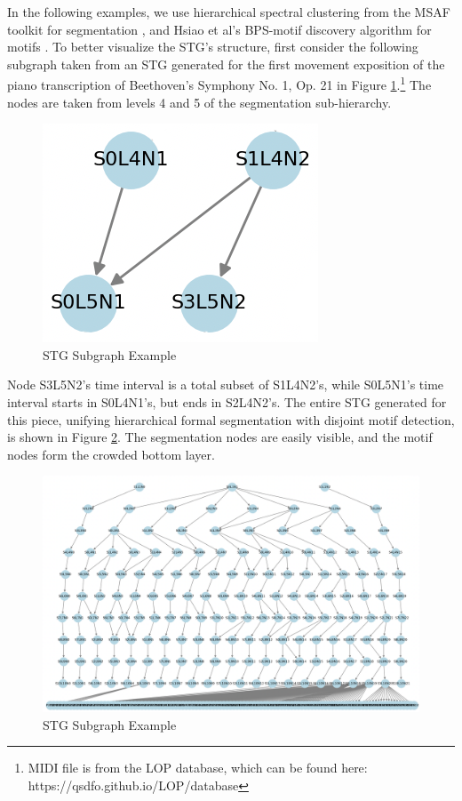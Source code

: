 \documentclass{article}
\begin{document}
In the following examples, we use hierarchical spectral clustering from the MSAF toolkit for segmentation \cite{msaf, scluster}, and Hsiao et al's BPS-motif discovery algorithm for motifs \cite{Hsiao_2023_motifs}. To better visualize the STG's structure, first consider the following subgraph taken from an STG generated for the first movement exposition of the piano transcription of Beethoven's Symphony No. 1, Op. 21 in Figure \ref{fig:stg_ex}.\footnote{MIDI file is from the LOP database, which can be found here: https://qsdfo.github.io/LOP/database} The nodes are taken from levels 4 and 5 of the segmentation sub-hierarchy.
\begin{figure}[h!]
  \centering
  \includegraphics[width=0.45\linewidth]{figs/stg_example}
  \caption{STG Subgraph Example}
  \label{fig:stg_ex}
\end{figure}
Node S3L5N2’s time interval is a total subset of S1L4N2's, while S0L5N1’s time interval starts in S0L4N1’s, but ends in S2L4N2’s. The entire STG generated for this piece, unifying hierarchical formal segmentation with disjoint motif detection, is shown in Figure \ref{fig:stg_full}. The segmentation nodes are easily visible, and the motif nodes form the crowded bottom layer.

\begin{figure}[h!]
  \centering
  \includegraphics[width=\linewidth]{figs/stg_full}
  \caption{STG Subgraph Example}
  \label{fig:stg_full}
\end{figure}
\vspace{-6mm}
\end{document}
